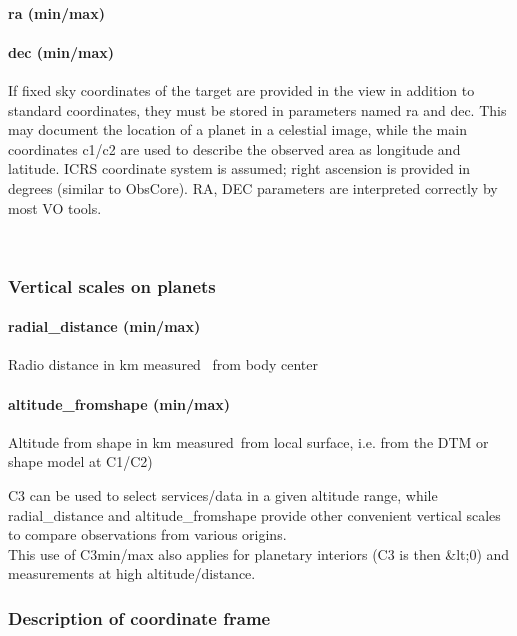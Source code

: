 \documentclass[11pt,a4paper]{ivoa}
\begin{document}
\paragraph{ra (min/max)}

\paragraph{dec (min/max)}

If fixed sky coordinates of the target are provided in the view in addition to standard coordinates, they must be stored in parameters named ra and dec. This may document the location of a planet in a celestial image, while the main coordinates c1/c2 are used to describe the observed area as longitude and latitude. ICRS coordinate system is assumed; right ascension is provided in degrees (similar to ObsCore). RA, DEC parameters are interpreted correctly by most VO tools.

 

\subsubsection{Vertical scales on planets}

\paragraph{radial\_distance (min/max)}

Radio distance in km measured  from body center

\paragraph{altitude\_fromshape (min/max)}

Altitude from shape in km measured from local surface, i.e. from the DTM or shape model at C1/C2)

C3 can be used to select services/data in a given altitude range, while radial\_distance and altitude\_fromshape provide other convenient vertical scales to compare observations from various origins.\\This use of C3min/max also applies for planetary interiors (C3 is then \&lt;0) and measurements at high altitude/distance. \\

\subsubsection{Description of coordinate frame}
\end{document}
